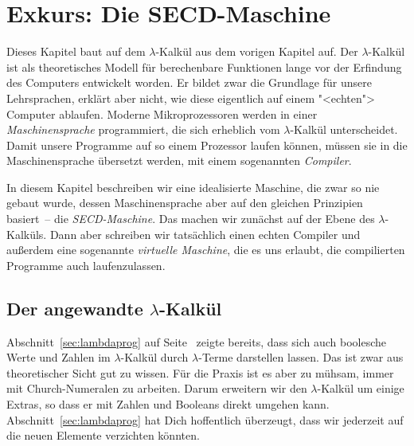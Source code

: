 

\chapter{Exkurs: Die SECD-Maschine}\label{cha:secd}

Dieses Kapitel baut auf dem $\lambda$-Kalkül aus dem vorigen Kapitel auf.
Der $\lambda$-Kalkül ist als theoretisches Modell für berechenbare
Funktionen lange vor der Erfindung des Computers entwickelt worden.
Er bildet zwar die Grundlage für unsere Lehrsprachen, erklärt aber
nicht, wie diese eigentlich auf einem "<echten"> Computer ablaufen.
Moderne Mikroprozessoren werden in einer \textit{Maschinensprache}
programmiert, die sich erheblich vom $\lambda$-Kalkül unterscheidet.
Damit unsere Programme auf so einem Prozessor laufen können, müssen
sie in die Maschinensprache übersetzt werden,
mit einem sogenannten \textit{Compiler}.

In diesem Kapitel beschreiben wir eine idealisierte Maschine, die zwar
so nie gebaut wurde, dessen Maschinensprache aber auf den gleichen
Prinzipien basiert~-- die \textit{SECD-Maschine}.  Das machen wir
zunächst auf der Ebene des $\lambda$-Kalküls.  Dann aber schreiben wir
tatsächlich einen echten Compiler und außerdem eine sogenannte
\textit{virtuelle Maschine}, die es uns erlaubt, die compilierten
Programme auch laufenzulassen.

\section{Der angewandte $\lambda$-Kalkül}

Abschnitt~\ref{sec:lambdaprog} auf Seite~\pageref{sec:lambdaprog}
zeigte bereits, dass sich auch boolesche Werte und Zahlen im
$\lambda$-Kalkül durch $\lambda$-Terme darstellen lassen.  Das ist
zwar aus theoretischer Sicht gut zu wissen.  Für die Praxis ist es
aber zu mühsam, immer mit Church-Numeralen zu arbeiten. Darum
erweitern wir den $\lambda$-Kalkül um einige Extras, so dass er mit
Zahlen und Booleans direkt umgehen kann.
Abschnitt~\ref{sec:lambdaprog} hat Dich hoffentlich überzeugt, dass
wir jederzeit auf die neuen Elemente verzichten könnten.

